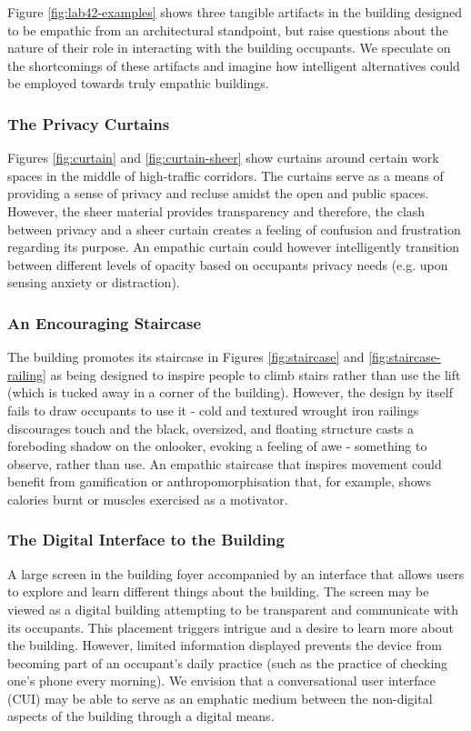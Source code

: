 \documentclass [sigconf, review, anonymous] {acmart}
\begin{document}
Figure \ref{fig:lab42-examples} shows three tangible artifacts in the building designed to be empathic from an architectural standpoint, but raise questions about the nature of their role in interacting with the building occupants. We speculate on the shortcomings of these artifacts and imagine how intelligent alternatives could be employed towards truly empathic buildings.

\subsubsection*{The Privacy Curtains}
Figures \ref{fig:curtain} and \ref{fig:curtain-sheer} show curtains around certain work spaces in the middle of high-traffic corridors. The curtains serve as a means of providing a sense of privacy and recluse amidst the open and public spaces. However, the sheer material provides transparency and therefore, the clash between privacy and a sheer curtain creates a feeling of confusion and frustration regarding its purpose. An empathic curtain could however intelligently transition between different levels of opacity based on occupants privacy needs (e.g. upon sensing anxiety or distraction).  

\subsubsection*{An Encouraging Staircase}
The building promotes its staircase in Figures \ref{fig:staircase} and \ref{fig:staircase-railing} as being designed to inspire people to climb stairs rather than use the lift (which is tucked away in a corner of the building). However, the design by itself fails to draw occupants to use it - cold and textured wrought iron railings discourages touch and the black, oversized, and floating structure casts a foreboding  shadow on the onlooker,  evoking a feeling of awe - something to observe, rather than use. An empathic staircase that inspires movement could benefit from gamification or anthropomorphisation that, for example, shows calories burnt or muscles exercised as a motivator. 

\subsubsection*{The Digital Interface to the Building}
A large screen in the building foyer accompanied by an interface that allows users to explore and learn different things about the building. The screen may be viewed as a digital building attempting to be transparent and communicate with its occupants. This placement triggers intrigue and a desire to learn more about the building. However, limited information displayed prevents the device from becoming part of an occupant's daily practice (such as the practice of checking one's phone every morning). We envision that a conversational user interface (CUI) may be able to serve as an emphatic medium between the non-digital aspects of the building through a digital means. 
\end{document}
